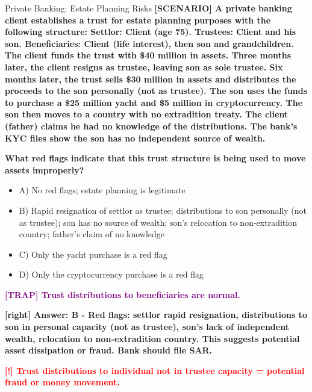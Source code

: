 \documentclass[11pt,a4paper]{beamer}
\newcommand{\redflag}[1]{\textcolor{red}{\textbf{[!] #1}}}
\newcommand{\trap}[1]{\textcolor{purple}{\textbf{[TRAP] #1}}}
\newcommand{\correct}[1]{\textcolor{green!50!black}{\textbf{[right] #1}}}
\newcommand{\scenario}[1]{\textcolor{blue!70!black}{\textbf{[SCENARIO] #1}}}
\begin{document}
	
	\begin{frame}{Private Banking: Estate Planning Risks}
		\tiny
		\scenario{A private banking client establishes a trust for estate planning purposes with the following structure: Settlor: Client (age 75). Trustees: Client and his son. Beneficiaries: Client (life interest), then son and grandchildren. The client funds the trust with \$40 million in assets. Three months later, the client resigns as trustee, leaving son as sole trustee. Six months later, the trust sells \$30 million in assets and distributes the proceeds to the son personally (not as trustee). The son uses the funds to purchase a \$25 million yacht and \$5 million in cryptocurrency. The son then moves to a country with no extradition treaty. The client (father) claims he had no knowledge of the distributions. The bank's KYC files show the son has no independent source of wealth.}
		
		\vspace{0.02cm}
		\textbf{What red flags indicate that this trust structure is being used to move assets improperly?}
		\vspace{0.02cm}
		
		\begin{itemize}
			\item A) No red flags; estate planning is legitimate
			\item B) Rapid resignation of settlor as trustee; distributions to son personally (not as trustee); son has no source of wealth; son's relocation to non-extradition country; father's claim of no knowledge
			\item C) Only the yacht purchase is a red flag
			\item D) Only the cryptocurrency purchase is a red flag
		\end{itemize}
		
		\vspace{0.02cm}
		\trap{Trust distributions to beneficiaries are normal.}
		
		\vspace{0.02cm}
		\correct{Answer: B - Red flags: settlor rapid resignation, distributions to son in personal capacity (not as trustee), son's lack of independent wealth, relocation to non-extradition country. This suggests potential asset dissipation or fraud. Bank should file SAR.}
		
		\vspace{0.02cm}
		\redflag{Trust distributions to individual not in trustee capacity = potential fraud or money movement.}
	\end{frame}
	
\end{document}
